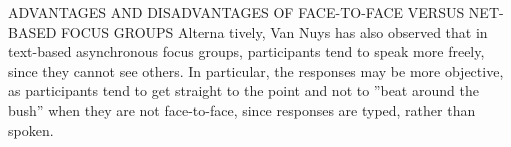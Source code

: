 \documentclass{beamer}
\begin{document}
\begin{frame}{ADVANTAGES AND DISADVANTAGES OF FACE-TO-FACE VERSUS
NET-BASED FOCUS GROUPS }
Alterna tively, Van Nuys has also observed that in text-based
asynchronous focus groups, participants tend to speak more freely, since
they cannot see others. In particular, the responses may be more objective,
as participants tend to get straight to the point and not to ”beat around
the bush” when they are not face-to-face, since responses are typed, rather
than spoken.
\end{frame}
\end{document}
